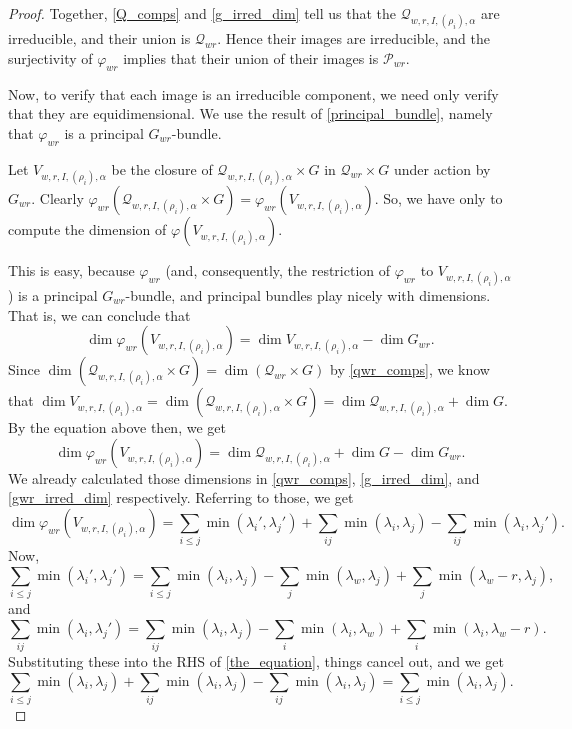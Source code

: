 \documentclass[12pt,psamsfonts]{article}
\begin{document}
\begin{proof}
    Together, \cref{Q_comps} and \cref{g_irred_dim} tell us that the \(\mathcal{Q}_{w,r,I,(\rho_i),\alpha}\) are irreducible, and their union is \(\mathcal{Q}_{wr}\).
    Hence their images are irreducible, and the surjectivity of \(\varphi_{wr}\) implies that their union of their images is \(\mathcal{P}_{wr}\).
    \par Now, to verify that each image is an irreducible component, we need only verify that they are equidimensional.
    We use the result of \cref{principal_bundle}, namely that \(\varphi_{wr}\) is a principal \(G_{wr}\)-bundle.
    \par Let \(V_{w,r,I,(\rho_i),\alpha}\) be the closure of \(\mathcal{Q}_{w,r,I,(\rho_i),\alpha} \times G\) in \(\mathcal{Q}_{wr} \times G\) under action by \(G_{wr}\).
    Clearly \(\varphi_{wr}(\mathcal{Q}_{w,r,I,(\rho_i),\alpha} \times G) = \varphi_{wr}(V_{w,r,I,(\rho_i),\alpha})\).
    So, we have only to compute the dimension of \(\varphi(V_{w,r,I,(\rho_i),\alpha})\).
    \par This is easy, because \(\varphi_{wr}\) (and, consequently, the restriction of \(\varphi_{wr}\) to \(V_{w,r,I,(\rho_i),\alpha}\)) is a principal \(G_{wr}\)-bundle, and principal bundles play nicely with dimensions.
    That is, we can conclude that 
    \[\dim \varphi_{wr}(V_{w,r,I,(\rho_i),\alpha}) = \dim V_{w,r,I,(\rho_i),\alpha} - \dim G_{wr}.\]
    Since \(\dim (\mathcal{Q}_{w,r,I,(\rho_i),\alpha} \times G) = \dim (\mathcal{Q}_{wr} \times G)\) by \cref{qwr_comps}, we know that \(\dim V_{w,r,I,(\rho_i),\alpha} = \dim (\mathcal{Q}_{w,r,I,(\rho_i),\alpha} \times G) = \dim \mathcal{Q}_{w,r,I,(\rho_i),\alpha} + \dim G\).
    By the equation above then, we get 
    \[\dim \varphi_{wr}(V_{w,r,I,(\rho_i),\alpha}) = \dim \mathcal{Q}_{w,r,I,(\rho_i),\alpha} + \dim G - \dim G_{wr}.\]
    We already calculated those dimensions in \cref{qwr_comps}, \cref{g_irred_dim}, and \cref{gwr_irred_dim} respectively.
    Referring to those, we get 
    \begin{equation}\label{the_equation}
        \dim \varphi_{wr}(V_{w,r,I,(\rho_i),\alpha}) = \sum_{i \leq j} \min(\lambda_i', \lambda_j') + \sum_{ij} \min(\lambda_i, \lambda_j) - \sum_{ij} \min(\lambda_i, \lambda_j').
    \end{equation}
    Now,
    \[\sum_{i \leq j} \min(\lambda_i', \lambda_j') = \sum_{i \leq j} \min(\lambda_i, \lambda_j) - \sum_j \min(\lambda_w, \lambda_j) + \sum_j \min(\lambda_w - r, \lambda_j),\]
    and
    \[\sum_{ij} \min(\lambda_i, \lambda_j') = \sum_{ij} \min(\lambda_i, \lambda_j) - \sum_i \min(\lambda_i, \lambda_w) + \sum_i \min(\lambda_i, \lambda_w - r).\]
    Substituting these into the RHS of \cref{the_equation}, things cancel out, and we get
    \[\sum_{i \leq j} \min(\lambda_i, \lambda_j) + \sum_{ij} \min(\lambda_i, \lambda_j) - \sum_{ij} \min(\lambda_i, \lambda_j) = \sum_{i \leq j} \min(\lambda_i, \lambda_j).\]
\end{proof}
\end{document}
